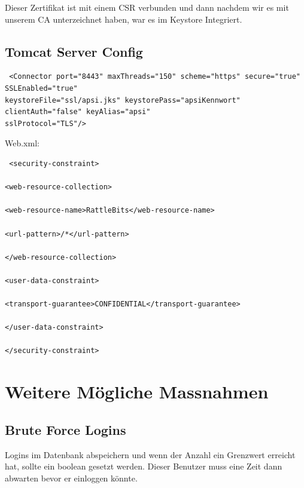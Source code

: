 \documentclass[10pt]{scrartcl}
\begin{document}
Dieser Zertifikat ist mit einem CSR verbunden und dann nachdem wir es mit unserem CA unterzeichnet haben, war es im 
Keystore Integriert.

\subsection{Tomcat Server Config}
\begin{verbatim}
 <Connector port="8443" maxThreads="150" scheme="https" secure="true" SSLEnabled="true" 
keystoreFile="ssl/apsi.jks" keystorePass="apsiKennwort" clientAuth="false" keyAlias="apsi" 
sslProtocol="TLS"/>
\end{verbatim}

Web.xml: \\
\begin{verbatim}
 <security-constraint>

<web-resource-collection>

<web-resource-name>RattleBits</web-resource-name>

<url-pattern>/*</url-pattern>

</web-resource-collection>

<user-data-constraint>

<transport-guarantee>CONFIDENTIAL</transport-guarantee>

</user-data-constraint>

</security-constraint>
\end{verbatim}


\section{Weitere Mögliche Massnahmen}

\subsection{Brute Force Logins}
Logins im Datenbank abspeichern und wenn der Anzahl ein Grenzwert erreicht hat, sollte ein boolean gesetzt werden. 
Dieser Benutzer muss eine Zeit dann abwarten bevor er einloggen könnte.

 
\end{document}
